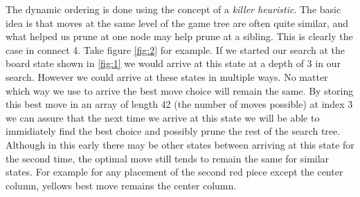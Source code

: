 \documentclass{article}
\begin{document}
The dynamic ordering is done using the concept of a \emph{killer heuristic}. The basic idea is that moves at the same level of the game tree are often quite similar, and what helped us prune at one node may help prune at a sibling. This is clearly the case in connect 4. Take figure \ref{fig:2} for example. If we started our search at the board state shown in \ref{fig:1} we would arrive at this state at a depth of 3 in our search. However we could arrive at these states in multiple ways. No matter which way we use to arrive the best move choice will remain the same. By storing this best move in an array of length 42 (the number of moves possible) at index 3 we can assure that the next time we arrive at this state we will be able to immidiately find the best choice and possibly prune the rest of the search tree. Although in this early there may be other states between arriving at this state for the second time, the optimal move still tends to remain the same for similar states. For example for any placement of the second red piece except the center column, yellows best move remains the center column.
\end{document}

